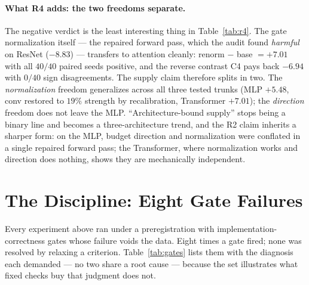 \documentclass[10pt]{article}
\begin{document}
\paragraph{What R4 adds: the two freedoms separate.} The negative verdict
is the least interesting thing in Table~\ref{tab:r4}. The gate
normalization itself --- the repaired forward pass, which the audit found
\emph{harmful} on ResNet ($-8.83$) --- transfers to attention cleanly:
renorm $-$ base $=+7.01$ with all $40/40$ paired seeds positive, and the
reverse contrast C4 pays back $-6.94$ with $0/40$ sign disagreements.
The supply claim therefore splits in two. The \emph{normalization}
freedom generalizes across all three tested trunks (MLP $+5.48$, conv
restored to $19\%$ strength by recalibration, Transformer $+7.01$); the
\emph{direction} freedom does not leave the MLP. ``Architecture-bound
supply'' stops being a binary line and becomes a three-architecture
trend, and the R2 claim inherits a sharper form: on the MLP, budget
direction and normalization were conflated in a single repaired forward
pass; the Transformer, where normalization works and direction does
nothing, shows they are mechanically independent.

\section{The Discipline: Eight Gate Failures}
\label{sec:discipline}

Every experiment above ran under a preregistration with
implementation-correctness gates whose failure voids the data. Eight times
a gate fired; none was resolved by relaxing a criterion.
Table~\ref{tab:gates} lists them with the diagnosis each demanded --- no
two share a root cause --- because the set illustrates what fixed checks
buy that judgment does not.
\end{document}
